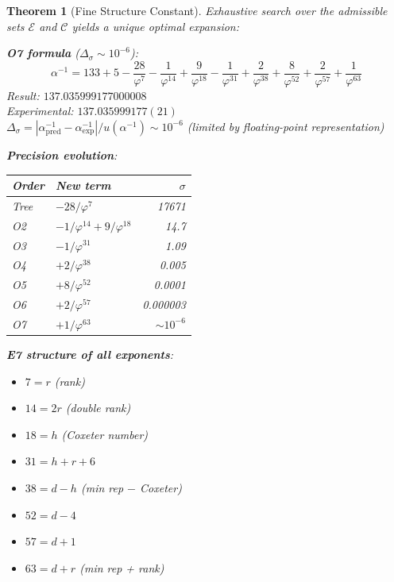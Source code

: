 \documentclass[11pt,a4paper]{article}
\newtheorem{theorem}{Theorem}
\begin{document}
\begin{theorem}[Fine Structure Constant]
Exhaustive search over the admissible sets $\mathcal{E}$ and $\mathcal{C}$ yields a unique optimal expansion:

\textbf{O7 formula} ($\Delta_\sigma \sim 10^{-6}$):
\begin{equation}
\boxed{\alpha^{-1} = 133 + 5 - \frac{28}{\varphi^7} - \frac{1}{\varphi^{14}} + \frac{9}{\varphi^{18}} - \frac{1}{\varphi^{31}} + \frac{2}{\varphi^{38}} + \frac{8}{\varphi^{52}} + \frac{2}{\varphi^{57}} + \frac{1}{\varphi^{63}}}
\end{equation}
Result: $137.035999177000008$\\
Experimental: $137.035999177(21)$~\cite{CODATA2022}\\
$\Delta_\sigma = |\alpha^{-1}_{\text{pred}} - \alpha^{-1}_{\text{exp}}|/u(\alpha^{-1}) \sim 10^{-6}$ (limited by floating-point representation)

\textbf{Precision evolution}:
\begin{center}
\begin{tabular}{|l|l|r|}
\hline
\textbf{Order} & \textbf{New term} & \textbf{$\sigma$} \\
\hline
Tree & $-28/\varphi^7$ & 17671 \\
O2 & $-1/\varphi^{14} + 9/\varphi^{18}$ & 14.7 \\
O3 & $-1/\varphi^{31}$ & 1.09 \\
O4 & $+2/\varphi^{38}$ & 0.005 \\
O5 & $+8/\varphi^{52}$ & 0.0001 \\
O6 & $+2/\varphi^{57}$ & 0.000003 \\
O7 & $+1/\varphi^{63}$ & $\sim 10^{-6}$ \\
\hline
\end{tabular}
\end{center}

\textbf{E7 structure of all exponents}:
\begin{itemize}
\item $7 = r$ (rank)
\item $14 = 2r$ (double rank)
\item $18 = h$ (Coxeter number)
\item $31 = h + r + 6$
\item $38 = d - h$ (min rep $-$ Coxeter)
\item $52 = d - 4$
\item $57 = d + 1$
\item $63 = d + r$ (min rep + rank)
\end{itemize}
\end{theorem}
\end{document}
